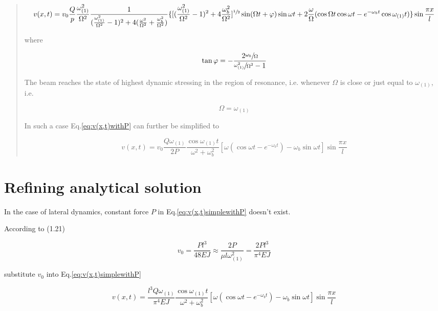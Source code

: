 \begin{quote}
\begin{dmath}\label{eq:v(x,t)withP}
v(x,t) = v_0 \frac{Q}{p}\frac{\omega_{(1)}^2}{\Omega^2}\frac{1}{(\frac{\omega_{(1)}^2}{\Omega^2}-1)^2+4(\frac{\omega^2}{\Omega^2}+\frac{\omega_b^2}{\Omega^2})}\{[(\frac{\omega_{(1)}^2}{\Omega^2}-1)^2+4\frac{\omega_b^2}{\Omega^2}]^{\sfrac{1}{2}} \sin (\Omega t + \varphi)\sin \omega t + 2\frac{\omega}{\Omega}(\cos \Omega t \cos \omega t - e^{-\omega_b t}\cos \omega_{(1)}t)\}\sin\frac{\pi x}{l}
\end{dmath}

where

\begin{equation}
    \tan \varphi = -\frac{2\sfrac{\omega_b}{\Omega}}{\sfrac{\omega_{(1)}^2}{\Omega^2}-1}
\end{equation}

The beam reaches the state of highest dynamic stressing in the region of resonance, i.e. whenever $\Omega$ is close or just equal to $\omega_{(1)}$, i.e.

\begin{equation}
    \Omega = \omega_{(1)}
\end{equation}

In such a case Eq.\ref{eq:v(x,t)withP} can further be simplified to 

\begin{equation}\label{eq:v(x,t)simplewithP}
    v(x,t) = v_0 \frac{Q\omega_{(1)}}{2P}\frac{\cos \omega_{(1)}t}{\omega^2+\omega_b^2}[\omega(\cos\omega t - e^{-\omega_b t})-\omega_b\sin\omega t]\sin\frac{\pi x}{l}
\end{equation}

\end{quote}


\section{Refining analytical solution}
In the case of lateral dynamics, constant force $P$ in Eq.\ref{eq:v(x,t)simplewithP} doesn't exist. 

According to (1.21)

\begin{equation}
    v_0 = \frac{Pl^3}{48EJ} \approx \frac{2P}{\mu l \omega_{(1)}^2} = \frac{2Pl^3}{\pi ^4 EJ}
\end{equation}


substitute $v_0$ into Eq.\ref{eq:v(x,t)simplewithP}

\begin{equation}\label{eq:v(x,t)simpleharmonic}
    v(x,t) = \frac{l^3Q\omega_{(1)}}{\pi^4 EJ}\frac{\cos \omega_{(1)}t}{\omega^2+\omega_b^2}[\omega(\cos\omega t - e^{-\omega_b t})-\omega_b\sin\omega t]\sin\frac{\pi x}{l}
\end{equation}

